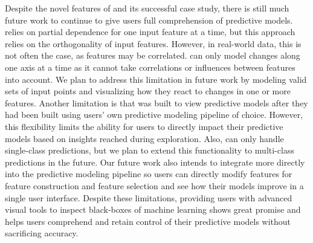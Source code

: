 Despite the novel features of \prospector and its successful case study, there is still much future work to continue to give users full comprehension of predictive models. \prospector relies on partial dependence for one input feature at a time, but this approach relies on the orthogonality of input features.  However, in real-world data, this is not often the case, as features may be correlated.  \prospector can only model changes along one axis at a time as it cannot take correlations or influences between features into account.
We plan to address this limitation in future work by modeling valid sets of input points and visualizing how
they react to changes in one or more features.  Another limitation is that \prospector was built to view predictive models after they had been built using users' own predictive modeling pipeline of choice.  However, this flexibility limits the ability for users to directly impact their predictive models based on insights reached during exploration. Also, \prospector can only handle single-class predictions, but we plan to extend this functionality to multi-class predictions in the future.
Our future work also intends to integrate \prospector more directly into the predictive modeling pipeline so users can directly modify features for feature construction and feature selection and see how their models improve in a single user interface.  Despite these limitations, providing users with advanced visual tools to inspect black-boxes of machine learning shows great promise and helps users comprehend and retain control of their predictive models without sacrificing accuracy.
